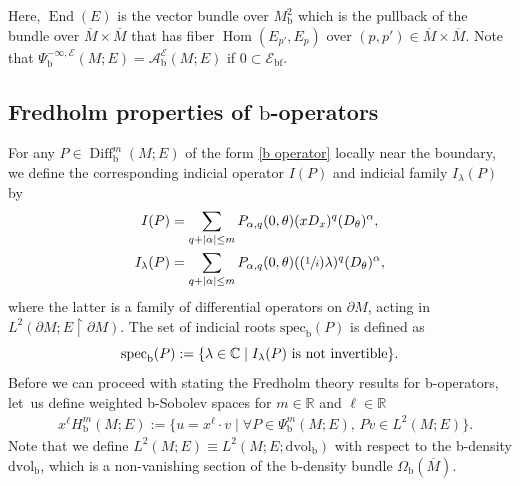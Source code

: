 \documentclass[11pt]{article}
\numberwithin{equation}{section}
\newcommand{\Psfrac}[2]{(\sfrac{#1}{#2})}
\theoremstyle{plain}
\theoremstyle{definition}
\newcommand\calA{{\mathcal A}}
\newcommand\calE{{\mathcal E}}
\newcommand{\bb}{{\mathrm{b}}}
\newcommand{\bbf}{{\mathrm{bf}}}
\newcommand{\dvol}{\mathrm{dvol}}
\newcommand{\specb}{\mathrm{spec}_\bb}
\DeclareMathOperator{\Diff}{Diff}
\DeclareMathOperator{\End}{End}
\DeclareMathOperator{\Hom}{Hom}
\newcommand{\dM}{{\partial M}}
\newcommand{\Mbar}{{\overline{M}}}\let\M\Mbar
\begin{document}
Here, $\End(E)$ is the vector bundle over $M^2_\bb$ which is the pullback of the bundle over $\Mbar\times\Mbar$ that has fiber $\Hom(E_{p'},E_p)$ over $(p,p')\in
\Mbar\times\Mbar$.
Note that $\Psi^{-\infty,\calE}_\bb(M;E) = \calA_\bb^\calE(M;E)$ if $0\subset\calE_\bbf$.

\subsection{Fredholm properties of \texorpdfstring{$\bb$}{b}-operators}\label{subsection-I}
For any $P \in \Diff^{m}_\bb(M; E)$ of the form \eqref{b operator} locally near the
boundary, we define the corresponding indicial operator $I(P)$ and indicial family $I_\lambda(P)$ by
\begin{align*}
I(P) &= \sum_{q+ \vert \alpha\vert \leq m} P_{\alpha, q}(0,\theta) (xD_x)^q (D_{\theta})^{\alpha}, \\
I_\lambda (P) &= \sum_{q+ \vert \alpha\vert \leq m} P_{\alpha, q}(0,\theta)(\Psfrac1i\lambda)^{q}(D_{\theta})^{\alpha},
\end{align*}
where the latter is a family of differential operators on $\dM$, acting in $L^2(\dM;E\restriction \dM)$. The set of indicial roots
$\specb(P)$ is defined as
\[
\specb(P):= \{\lambda \in \C \mid I_{\lambda}(P) \ \text{is not invertible}\}.
\]
Before we can proceed with stating the Fredholm theory results for b-operators,
let~us define weighted b-Sobolev spaces for $m \in \mathbb{R}$ and $\ell \in \mathbb{R}$
\begin{align*}
&x^{\ell}H^{m}_\bb(M;E) := \{ u = x^{\ell} \cdot v
\mid \forall P \in
\Psi^{m}_\bb(M;E),\,P v \in L^{2}(M;E)\}.
\end{align*}
Note that we define $L^2(M;E) \equiv L^2(M; E; \dvol_\bb)$ with respect to the b-density $\dvol_\bb$,
which is a non-vanishing section of the b-density bundle $\Omega_\bb(\Mbar)$.
\end{document}
